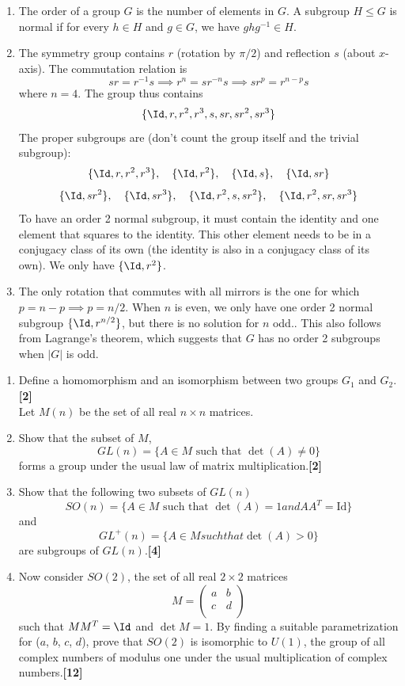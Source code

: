 \documentclass[a4paper]{article}
\begin{document}
\begin{ans}\leavevmode
\begin{enumerate}[label=(\roman*)]
\item The order of a group $G$ is the number of elements in $G$. A subgroup $H\leq G$ is normal if for every $h\in H$ and $g\in G$, we have $ghg^{-1}\in H$.
\item The symmetry group contains $r$ (rotation by $\pi/2$) and reflection $s$ (about $x$-axis). The commutation relation is $$sr=r^{-1}s\implies r^n=sr^{-n}s\implies sr^p=r^{n-p}s$$
where $n=4$. The group thus contains 
$$\{\Id,r,r^2,r^3,s,sr,sr^2,sr^3\}$$
The proper subgroups are (don't count the group itself and the trivial subgroup): $$\{\Id,r,r^2,r^3\},\quad\{\Id,r^2\},\quad\{\Id,s\},\quad\{\Id,sr\}$$
$$\{\Id,sr^2\},\quad\{\Id,sr^3\},\quad\{\Id,r^2,s,sr^2\},\quad\{\Id,r^2,sr,sr^3\}$$
To have an order 2 normal subgroup, it must contain the identity and one element that squares to the identity. This other element needs to be in a conjugacy class of its own (the identity is also in a conjugacy class of its own). We only have $\{\Id,r^2\}$.
\item The only rotation that commutes with all mirrors is the one for which $p=n-p\implies p=n/2$. When $n$ is even, we only have one order 2 normal subgroup $\{\Id,r^{n/2}\}$, but there is no solution for $n$ odd.. This also follows from Lagrange's theorem, which suggests that $G$ has no order 2 subgroups when $|G|$ is odd.
\end{enumerate}
\end{ans}
\newpage
\begin{qns}\leavevmode
\begin{enumerate}[label=(\roman*)]
\item Define a homomorphism and an isomorphism between two groups $G_1$ and $G_2$.\hfill\textbf{[2]}\\[5pt]
Let $M(n)$ be the set of all real $n\times n$ matrices.
\item Show that the subset of $M$,
$$GL(n) = \{A \in M \text{  such that }\det(A)\neq 0\}$$
forms a group under the usual law of matrix multiplication.\hfill\textbf{[2]}
\item Show that the following two subsets of $GL(n)$
$$SO(n) = \{A \in M\text{  such that }\det(A) = 1 and AA^T = \text{Id}\}$$
and
$$GL^+(n) = \{A \in M such that \det(A) > 0\}$$
are subgroups of $GL(n)$.\hfill\textbf{[4]}
\item Now consider $SO(2)$, the set of all real $2\times 2$ matrices
$$M=\begin{pmatrix}a&b\\c&d\\\end{pmatrix}$$
such that $MM^T = \Id$ and $\det M = 1$. By finding a suitable parametrization for ($a$, $b$, $c$, $d$), prove that $SO(2)$ is isomorphic to $U(1)$, the group of all complex numbers of modulus one under the usual multiplication of complex numbers.\hfill\textbf{[12]}
\end{enumerate}
\end{qns}
\end{document}
